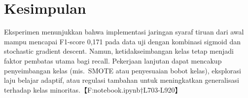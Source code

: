 \documentclass[12pt]{article}
\begin{document}
\section*{Kesimpulan}
Eksperimen menunjukkan bahwa implementasi jaringan syaraf tiruan dari awal mampu mencapai F1-score 0,171 pada data uji dengan kombinasi sigmoid dan stochastic gradient descent. Namun, ketidakseimbangan kelas tetap menjadi faktor pembatas utama bagi recall. Pekerjaan lanjutan dapat mencakup penyeimbangan kelas (mis.~SMOTE atau penyesuaian bobot kelas), eksplorasi laju belajar adaptif, atau regulasi tambahan untuk meningkatkan generalisasi terhadap kelas minoritas.【F:notebook.ipynb†L703-L920】
\end{document}
